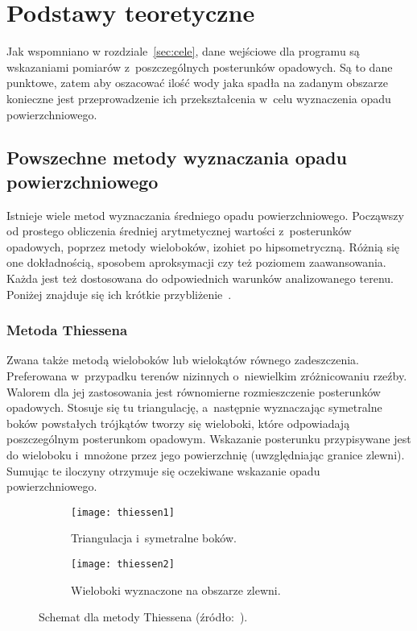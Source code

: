 \chapter{Podstawy teoretyczne}
Jak wspomniano w rozdziale~\ref{sec:cele}, dane wejściowe dla programu są wskazaniami pomiarów z~poszczególnych posterunków opadowych. Są to dane punktowe, zatem aby oszacować ilość wody jaka spadła na zadanym obszarze konieczne jest przeprowadzenie ich przekształcenia w~celu wyznaczenia opadu powierzchniowego.

\section{Powszechne metody wyznaczania opadu powierzchniowego}

Istnieje wiele metod wyznaczania średniego opadu powierzchniowego. Począwszy od prostego obliczenia średniej arytmetycznej wartości z~posterunków opadowych, poprzez metody wieloboków, izohiet po hipsometryczną. Różnią się one dokładnością, sposobem aproksymacji czy też poziomem zaawansowania. Każda jest też dostosowana do odpowiednich warunków analizowanego terenu. Poniżej znajduje się ich krótkie przybliżenie~\cite{obliczanie_opadu_sredniego, metody_obliczania_pb, opad_metody}.

\subsection{Metoda Thiessena}
Zwana także metodą wieloboków lub wielokątów równego zadeszczenia. Preferowana w~przypadku terenów nizinnych o~niewielkim zróżnicowaniu rzeźby. Walorem dla jej zastosowania jest równomierne rozmieszczenie posterunków opadowych. Stosuje się tu triangulację, a~następnie wyznaczając symetralne boków powstałych trójkątów tworzy się wieloboki, które odpowiadają poszczególnym posterunkom opadowym. Wskazanie posterunku przypisywane jest do wieloboku i~mnożone przez jego powierzchnię (uwzględniając granice zlewni). Sumując te iloczyny otrzymuje się oczekiwane wskazanie opadu powierzchniowego.

\begin{figure}[!ht]
	\begin{subfigure}{.5\textwidth}
		\centering
		\texttt{[image: thiessen1]}
		\caption{Triangulacja i~symetralne boków.}
	\end{subfigure}%
	\begin{subfigure}{.5\textwidth}
		\centering
		\texttt{[image: thiessen2]}
		\caption{Wieloboki wyznaczone na obszarze zlewni.}
	\end{subfigure}	
\caption{Schemat dla metody Thiessena (źródło:~\cite{obliczanie_opadu_sredniego}). }
\end{figure}


